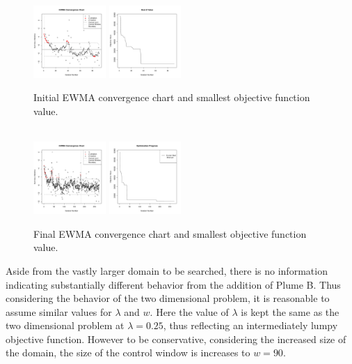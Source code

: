 \documentclass[12pt]{article}
\begin{document}
	\begin{figure}
	\includegraphics[width=0.245\textwidth]{./figures/ewmaConvChartLock6Three20000Start.pdf}
	\includegraphics[width=0.245\textwidth]{./figures/bestZLock6Three20000Start.pdf}
	\caption{Initial EWMA convergence chart and smallest objective function value. }
	\label{lock6EWMAStart}
	$~$\\
	\includegraphics[width=0.245\textwidth]{./figures/ewmaConvChartLock6Three20000End.pdf}
	\includegraphics[width=0.245\textwidth]{./figures/bestZLock6Three20000End.pdf}
	\caption{Final EWMA convergence chart and smallest objective function value. }
	\label{lock6EWMAEnd}
	\end{figure}
	
	
	Aside from the vastly larger domain to be searched, there is no information indicating substantially different behavior from the addition of Plume B.
	Thus considering the behavior of the two dimensional problem, it is reasonable to assume similar values for $\lambda$ and $w$.
	Here the value of $\lambda$ is kept the same as the two dimensional problem at $\lambda=0.25$, thus reflecting an intermediately lumpy objective function.
	However to be conservative, considering the increased size of the domain, the size of the control window is increases to $w=90$. 
	
\end{document}

